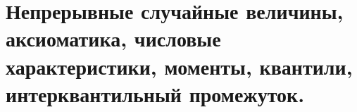 \documentclass[polytech/stats/exam-2023/stats-exam-2023.tex]{subfiles}
\begin{document}
\section{Непрерывные случайные величины, аксиоматика, числовые характеристики, моменты, квантили, интерквантильный промежуток.}
\end{document}
